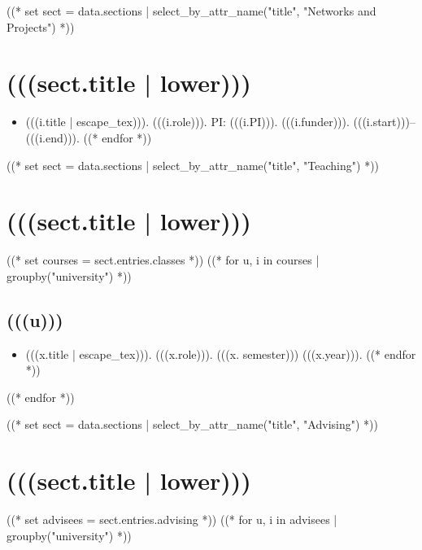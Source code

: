 \documentclass[11pt,article,oneside]{memoir}
\begin{document}
((* set sect = data.sections | select_by_attr_name("title", "Networks and Projects") *))
\section{(((sect.title | lower)))}

\mbox{}\vspace{-\dimexpr\baselineskip\relax}

\begin{itemize}[label={}]
((* for i in sect.entries.projects | sort_by_attr(["start"], reverse=True) *))
\item (((i.title | escape_tex))). (((i.role))). PI: (((i.PI))). (((i.funder))). (((i.start)))--(((i.end))).
((* endfor *))
\end{itemize}

((* set sect = data.sections | select_by_attr_name("title", "Teaching") *))
\section{(((sect.title | lower)))}

\mbox{}\vspace{-\dimexpr\baselineskip\relax}

\vspace{\baselineskip}

((* set courses = sect.entries.classes *))
((* for u, i in courses | groupby("university")  *))
\subsection{(((u)))}
\begin{itemize}[label={}]
((* for x in i | sort_first_year("year", reverse=True) *))
\item (((x.title | escape_tex))). (((x.role))). (((x. semester))) (((x.year))).
((* endfor *))
\end{itemize}
((* endfor *))

((* set sect = data.sections | select_by_attr_name("title", "Advising") *))
\section{(((sect.title | lower)))}

\mbox{}\vspace{-\dimexpr\baselineskip\relax}

\vspace{\baselineskip}
((* set advisees = sect.entries.advising *))
((* for u, i in advisees | groupby("university") *))
\end{document}
